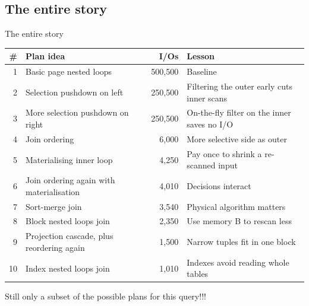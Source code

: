 \subsection{The entire story}

\begin{frame}{The entire story }
  \footnotesize
  \begin{center}
  \begin{tabular}{r l r l}
    \toprule
    \textbf{\#} & \textbf{Plan idea} & \textbf{I/Os} & \textbf{Lesson} \\
    \midrule
    1  & Basic page nested loops                    & 500,500 & Baseline \\
    2  & Selection pushdown on left                 & 250,500 & Filtering the outer early cuts inner scans \\
    3  & More selection pushdown on right           & 250,500 & On-the-fly filter on the inner saves no I/O \\
    4  & Join ordering                              & 6,000   & More selective side as outer \\
    5  & Materialising inner loop                   & 4,250   & Pay once to shrink a re-scanned input \\
    6  & Join ordering again with materialisation   & 4,010   & Decisions interact \\
    7  & Sort-merge join                            & 3,540   & Physical algorithm matters \\
    8  & Block nested loops join                    & 2,350   & Use memory B to rescan less \\
    9  & Projection cascade, plus reordering again  & 1,500   & Narrow tuples fit in one block \\
    \rowcolor{vinuRed!8}
    10 & Index nested loops join                    & 1,010   & Indexes avoid reading whole tables \\
    \bottomrule
  \end{tabular}
  \end{center}
  \centering Still only a \alert{subset} of the possible plans for this query!!!
\end{frame}


